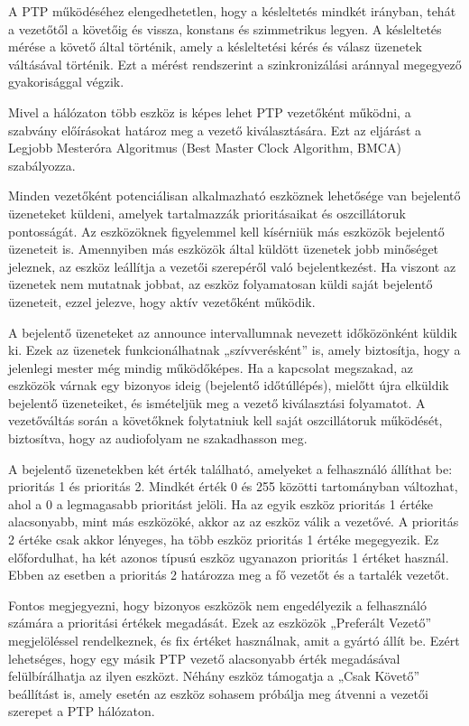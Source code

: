 A PTP működéséhez elengedhetetlen, hogy a késleltetés mindkét irányban, tehát a vezetőtől a követőig 
és vissza, konstans és szimmetrikus legyen. A késleltetés mérése a követő által történik, amely a 
késleltetési kérés és válasz üzenetek váltásával történik. Ezt a mérést rendszerint a szinkronizálási 
aránnyal megegyező gyakorisággal végzik.

Mivel a hálózaton több eszköz is képes lehet PTP vezetőként működni, a szabvány előírásokat határoz 
meg a vezető kiválasztására. Ezt az eljárást a Legjobb Mesteróra Algoritmus (Best Master Clock Algorithm, BMCA) szabályozza.

Minden vezetőként potenciálisan alkalmazható eszköznek lehetősége van bejelentő üzeneteket küldeni, 
amelyek tartalmazzák prioritásaikat és oszcillátoruk pontosságát. Az eszközöknek figyelemmel kell kísérniük más 
eszközök bejelentő üzeneteit is. Amennyiben más eszközök által küldött üzenetek jobb minőséget jeleznek, 
az eszköz leállítja a vezetői szerepéről való bejelentkezést. Ha viszont az üzenetek nem mutatnak jobbat, 
az eszköz folyamatosan küldi saját bejelentő üzeneteit, ezzel jelezve, hogy aktív vezetőként működik.

A bejelentő üzeneteket az announce intervallumnak nevezett időközönként küldik ki. 
Ezek az üzenetek funkcionálhatnak „szívverésként” is, amely biztosítja, hogy a jelenlegi mester még mindig működőképes. 
Ha a kapcsolat megszakad, az eszközök várnak egy bizonyos ideig (bejelentő időtúllépés), 
mielőtt újra elküldik bejelentő üzeneteiket, és ismételjük meg a vezető kiválasztási folyamatot. 
A vezetőváltás során a követőknek folytatniuk kell saját oszcillátoruk működését, biztosítva, hogy az audiofolyam ne szakadhasson meg.

A bejelentő üzenetekben két érték található, amelyeket a felhasználó állíthat be: prioritás 1 és prioritás 2. 
Mindkét érték 0 és 255 közötti tartományban változhat, ahol a 0 a legmagasabb prioritást jelöli. 
Ha az egyik eszköz prioritás 1 értéke alacsonyabb, mint más eszközöké, akkor az az eszköz válik a vezetővé. 
A prioritás 2 értéke csak akkor lényeges, ha több eszköz prioritás 1 értéke megegyezik. 
Ez előfordulhat, ha két azonos típusú eszköz ugyanazon prioritás 1 értéket használ. 
Ebben az esetben a prioritás 2 határozza meg a fő vezetőt és a tartalék vezetőt.

Fontos megjegyezni, hogy bizonyos eszközök nem engedélyezik a felhasználó számára a prioritási értékek megadását. 
Ezek az eszközök „Preferált Vezető” megjelöléssel rendelkeznek, és fix értéket használnak, amit a gyártó állít be. 
Ezért lehetséges, hogy egy másik PTP vezető alacsonyabb érték megadásával felülbírálhatja az ilyen eszközt. 
Néhány eszköz támogatja a „Csak Követő” beállítást is, amely esetén az eszköz sohasem próbálja meg átvenni a vezetői szerepet a PTP hálózaton.
